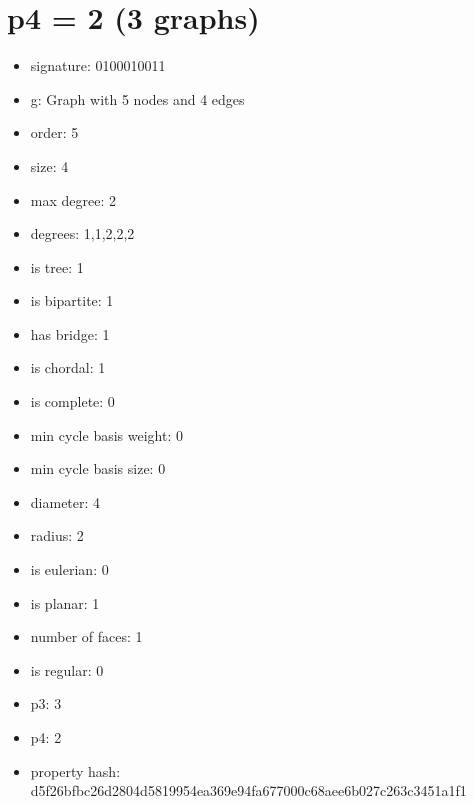 \chapter{p4 = 2 (3 graphs)}
\newpage\begin{figure}
\end{figure}
\begin{itemize}
\item signature: 0100010011
\item g: Graph with 5 nodes and 4 edges
\item order: 5
\item size: 4
\item max degree: 2
\item degrees: 1,1,2,2,2
\item is tree: 1
\item is bipartite: 1
\item has bridge: 1
\item is chordal: 1
\item is complete: 0
\item min cycle basis weight: 0
\item min cycle basis size: 0
\item diameter: 4
\item radius: 2
\item is eulerian: 0
\item is planar: 1
\item number of faces: 1
\item is regular: 0
\item p3: 3
\item p4: 2
\item property hash: d5f26bfbc26d2804d5819954ea369e94fa677000c68aee6b027c263c3451a1f1
\end{itemize}
\newpage
\begin{figure}
\end{figure}
